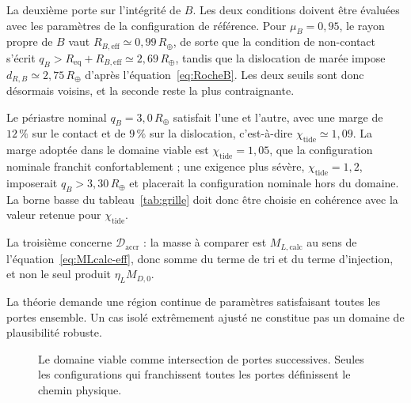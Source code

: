 \documentclass[11pt,a4paper,openany]{report}
\newcommand{\Rt}{R_{\oplus}}
\newcommand{\Req}{R_{\mathrm{eq}}}
\begin{document}
La deuxième porte sur l'intégrité de $B$. Les deux conditions doivent être évaluées avec les
paramètres de la configuration de référence. Pour $\mu_B=0{,}95$, le rayon propre de $B$ vaut
$R_{B,\mathrm{eff}}\simeq0{,}99\,\Rt$, de sorte que la condition de non-contact s'écrit
$q_B>\Req+R_{B,\mathrm{eff}}\simeq2{,}69\,\Rt$, tandis que la dislocation de marée impose
$d_{R,B}\simeq2{,}75\,\Rt$ d'après l'équation~\eqref{eq:RocheB}. Les deux seuils sont donc
désormais voisins, et la seconde reste la plus contraignante.

Le périastre nominal $q_B=3{,}0\,\Rt$ satisfait l'une et l'autre, avec une marge de $12\,\%$ sur le
contact et de $9\,\%$ sur la dislocation, c'est-à-dire $\chi_{\mathrm{tide}}\simeq1{,}09$. La marge
adoptée dans le domaine viable est $\chi_{\mathrm{tide}}=1{,}05$, que la configuration nominale
franchit confortablement ; une exigence plus sévère, $\chi_{\mathrm{tide}}=1{,}2$, imposerait
$q_B>3{,}30\,\Rt$ et placerait la configuration nominale hors du domaine. La borne basse du
tableau~\ref{tab:grille} doit donc être choisie en cohérence avec la valeur retenue pour
$\chi_{\mathrm{tide}}$.

La troisième concerne $\mathcal{D}_{\mathrm{accr}}$ : la masse à comparer est
$M_{L,\mathrm{calc}}$ au sens de l'équation~\eqref{eq:MLcalc-eff}, donc somme du terme de tri et du
terme d'injection, et non le seul produit $\eta_L M_{D,0}$.

\begin{falsif}
La théorie demande une région continue de paramètres satisfaisant toutes les portes ensemble.
Un cas isolé extrêmement ajusté ne constitue pas un domaine de plausibilité robuste.
\end{falsif}


\begin{figure}[htbp]
\centering
{}
\caption{Le domaine viable comme intersection de portes successives. Seules les configurations
qui franchissent toutes les portes définissent le chemin physique.}
\label{fig:portes}
\end{figure}
\end{document}
